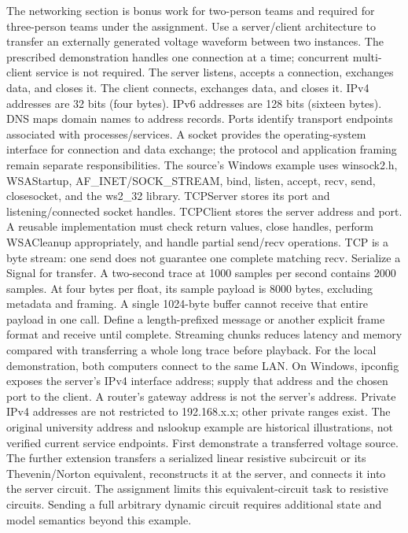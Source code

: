 \documentclass[11pt,a4paper]{article}
\begin{document}
The networking section is bonus work for two-person teams and required for three-person teams under the assignment. Use a server/\allowbreak{}client architecture to transfer an externally generated voltage waveform between two instances. The prescribed demonstration handles one connection at a time;\allowbreak{} concurrent multi-client service is not required. The server listens, accepts a connection, exchanges data, and closes it. The client connects, exchanges data, and closes it. IPv4 addresses are 32 bits (four bytes). IPv6 addresses are 128 bits (sixteen bytes). DNS maps domain names to address records. Ports identify transport endpoints associated with processes/\allowbreak{}services. A socket provides the operating-system interface for connection and data exchange;\allowbreak{} the protocol and application framing remain separate responsibilities. The source's Windows example uses winsock2.h, WSAStartup, AF\_\allowbreak{}INET/\allowbreak{}SOCK\_\allowbreak{}STREAM, bind, listen, accept, recv, send, closesocket, and the ws2\_\allowbreak{}32 library. TCPServer stores its port and listening/\allowbreak{}connected socket handles. TCPClient stores the server address and port. A reusable implementation must check return values, close handles, perform WSACleanup appropriately, and handle partial send/\allowbreak{}recv operations. TCP is a byte stream:\allowbreak{} one send does not guarantee one complete matching recv. Serialize a Signal for transfer. A two-second trace at 1000 samples per second contains 2000 samples. At four bytes per float, its sample payload is 8000 bytes, excluding metadata and framing. A single 1024-byte buffer cannot receive that entire payload in one call. Define a length-prefixed message or another explicit frame format and receive until complete. Streaming chunks reduces latency and memory compared with transferring a whole long trace before playback. For the local demonstration, both computers connect to the same LAN. On Windows, ipconfig exposes the server's IPv4 interface address;\allowbreak{} supply that address and the chosen port to the client. A router's gateway address is not the server's address. Private IPv4 addresses are not restricted to 192.168.x.x;\allowbreak{} other private ranges exist. The original university address and nslookup example are historical illustrations, not verified current service endpoints. First demonstrate a transferred voltage source. The further extension transfers a serialized linear resistive subcircuit or its Thevenin/\allowbreak{}Norton equivalent, reconstructs it at the server, and connects it into the server circuit. The assignment limits this equivalent-circuit task to resistive circuits. Sending a full arbitrary dynamic circuit requires additional state and model semantics beyond this example.
\end{document}
